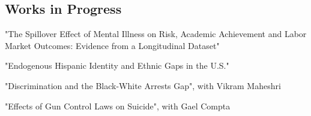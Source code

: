 \documentclass[10pt,letterpaper]{article}
\renewenvironment{itemize}{
  \begin{list}{}{
    \setlength{\leftmargin}{1.5em}
  }
}{
  \end{list}
}
\begin{document}
\subsection*{Works in Progress}
%
\begin{itemize}

\item "The Spillover Effect of Mental Illness on Risk, Academic Achievement and Labor Market Outcomes: Evidence from a Longitudinal Dataset"
\item "Endogenous Hispanic Identity and Ethnic Gaps in the U.S."
\item "Discrimination and the Black-White Arrests Gap", with Vikram Maheshri
\item "Effects of Gun Control Laws on Suicide", with Gael Compta

%


\end{itemize}
\end{document}
